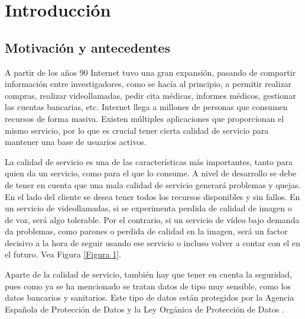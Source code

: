 \chapter{Introducción}\label{introduccion}

\section{Motivación y antecedentes}

A partir de los años 90 Internet tuvo una gran expansión, pasando de compartir información entre investigadores, 
como se hacía al principio, a permitir realizar compras, realizar videollamadas, pedir cita médicas, informes médicos, gestionar 
las cuentas bancarias, etc. Internet llega a millones de personas que consumen recursos de forma masiva. 
Existen múltiples aplicaciones que proporcionan el mismo servicio, por lo que es crucial tener cierta calidad de servicio 
\cite{microqos} para mantener una base de usuarios activos.

\intro La calidad de servicio es una de las características más importantes, tanto para quien da un servicio, como para el que lo 
consume. A nivel de desarrollo se debe de tener en cuenta que una mala calidad de servicio generará problemas y quejas. En el lado del 
cliente se desea tener todos los recursos disponibles y sin fallos. En un servicio de videollamadas, si se experimenta perdida de 
calidad de imagen o de voz, será algo tolerable. Por el contrario, si un servicio de vídeo bajo demanda da problemas, como parones o 
perdida de calidad en la imagen, será un factor decisivo a la hora de seguir usando ese servicio o incluso volver a contar con el 
en el futuro. Vea Figura \ref{Figura 1}.


\intro Aparte de la calidad de servicio, también hay que tener en cuenta la seguridad, pues como ya se ha mencionado 
se tratan datos de tipo muy sensible, como los datos bancarios y sanitarios. Este tipo de datos están protegidos por la Agencia 
Española de Protección de Datos \cite{aepdindex} y la Ley Orgánica de Protección de Datos \cite{lopdindex}.

